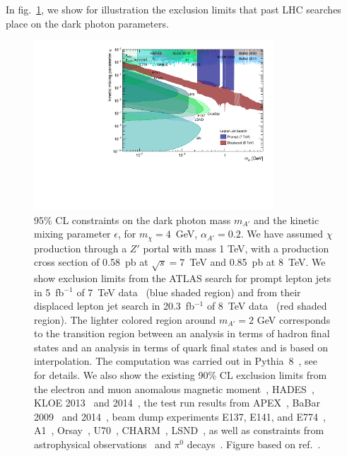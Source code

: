 \begin{enumerate}
In fig.~\ref{fig:radiating-dm-limits}, we show for
illustration the exclusion limits that past LHC searches place on the dark photon
parameters.

\begin{figure}
  \begin{center}
    \includegraphics[width=0.8\textwidth]{figures/DS_DarkPhoton_Constraints.pdf}
  \end{center}
  \vspace{-0.7cm}
  \caption{
    95\% CL constraints on the dark photon mass $m_{A'}$ and the kinetic mixing
    parameter $\epsilon$, for $m_\chi = 4$~GeV, $\alpha_{A'} = 0.2$.  We have
    assumed $\chi$ production through a $Z'$ portal with mass 1 TeV, with a production cross
    section of 0.58~pb at $\sqrt{s} = 7$~TeV and 0.85~pb at 8~TeV.
    We show exclusion limits from the ATLAS search for prompt lepton
    jets in 5~fb$^{-1}$ of 7~TeV data~\cite{Aad:2012qua} (blue shaded region)
    and from their displaced lepton jet search in 20.3~fb$^{-1}$ of 8~TeV
    data~\cite{Aad:2014yea} (red shaded region).
    The lighter colored region around $m_{A'}=2$ GeV corresponds to the
    transition region between an analysis in terms of hadron final states and
    an analysis in terms of quark final states and is based on interpolation.
    The computation was carried out in Pythia~8~\cite{Carloni:2010tw,
    Carloni:2011kk, Sjostrand:2014zea}, see~\cite{Buschmann:2015awa} for
    details.  We also show the existing 90\% CL exclusion limits from the
    electron and muon anomalous magnetic
    moment~\cite{Pospelov:2008zw,Davoudiasl:2012ig,Endo:2012hp},
    HADES~\cite{Agakishiev:2013fwl}, KLOE 2013~\cite{Babusci:2012cr} and
    2014~\cite{Babusci:2014sta}, the test run results from
    APEX~\cite{Abrahamyan:2011gv}, BaBar 2009~\cite{Aubert:2009cp} and
    2014~\cite{Lees:2014xha}, beam dump experiments E137, E141, and
    E774~\cite{Blumlein:2011mv,Bjorken:2009mm,Bross:1989mp},
    A1~\cite{Merkel:2011ze}, Orsay~\cite{Davier:1989wz},
    U70~\cite{Blumlein:2013cua}, CHARM~\cite{Gninenko:2012eq},
    LSND~\cite{Essig:2010gu}, as well as constraints from astrophysical
    observations~\cite{Dent:2012mx,Dreiner:2013mua} and $\pi^0$
    decays~\cite{CERNNA48/2:2015lha}. Figure based on
    ref.~\cite{Buschmann:2015awa}.}
  \label{fig:radiating-dm-limits}
\end{figure}






\end{enumerate}
